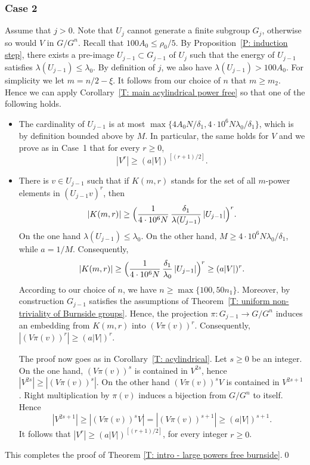 \subsubsection*{Case 2}
Assume that $j > 0$.
Note that $U_j$ cannot generate a finite subgroup $G_j$, otherwise so would $V$ in $G/G^n$.
Recall that $100 A_0 \leq \rho_0/5$.
By Proposition~\ref{P: induction step}, there exists a pre-image $U_{j-1}\subset G_{j-1}$ of $U_j$ such that the energy of $U_{j-1}$ satisfies $\lambda(U_{j-1}) \leqslant \lambda_0$.
By definition of $j$, we also have $\lambda(U_{j-1})> 100A_0$.
For simplicity we let $m = n/2 - \xi$.
It follows from our choice of $n$ that $m \geq m_2$.
Hence we can apply Corollary~\ref{T: main acylindrical power free} so that one of the following holds.
\begin{itemize}
\item The cardinality of $U_{j-1}$ is at most $\max\{4A_0N/\delta_1,4\cdot 10^6 N \lambda_0/\delta_1\}$, which is by definition bounded above by $M$.
In particular, the same holds for $V$ and we prove as in Case~1 that for every $r \geq 0$,
\begin{equation*}
|V^r| \geq \left(a |V|\right)^{[(r+1)/2]}.
\end{equation*}
\item There is $v \in U_{j-1}$ such that if $K(m,r)$ stands for the set of all $m$-power elements in $(U_{j-1}v)^r$, then
\begin{equation*}
|K(m,r)|
\geq \Bigl( \frac{1}{4\cdot 10^6 N}\,\frac{\delta_1}{\lambda(U_{j-1})}\, |U_{j-1}|\Bigr)^r.
\end{equation*}
On the one hand $\lambda(U_{j-1}) \leqslant \lambda_0$.
On the other hand, $M \geq 4\cdot 10^6 N \lambda_0/\delta_1$, while $a = 1/M$.
Consequently,
\begin{equation*}
|K(m,r)|
\geq \Bigl( \frac{1}{4\cdot 10^6 N}\,\frac{\delta_1}{\lambda_0}\, |U_{j-1}|\Bigr)^r
\geq(a|V|)^r.
\end{equation*}
According to our choice of $n$, we have $n \geq \max\{100, 50n_1\}$.
Moreover, by construction $G_{j-1}$ satisfies the assumptions of Theorem~\ref{T: uniform non-triviality of Burnside groups}.
Hence, the projection $\pi \colon G_{j-1} \to G/G^n$ induces an embedding from $K(m,r)$ into $(V \pi(v))^r$.
Consequently, $|(V \pi(v))^r| \geq \left(a |V|\right)^{r}.$

The proof now goes as in Corollary~\ref{T: acylindrical}.
Let $s \geq 0$ be an integer.
On the one hand, $(V\pi(v))^s$ is contained in $V^{2s}$, hence $|V^{2s}| \geq |(V\pi(v))^s|$.
On the other hand $(V\pi(v))^sV$ is contained in $V^{2s+1}$.
Right multiplication by $\pi(v)$ induces a bijection from $G/G^n$ to itself.
Hence
\begin{equation*}
|V^{2s+1}| \geq |(V\pi(v))^sV| = |(V\pi(v))^{s+1}| \geq \left(a |V|\right)^{s+1}.
\end{equation*}
It follows that $|V^r| \geq \left(a |V|\right)^{[(r+1)/2]}$, for every integer $r \geq 0$.
\end{itemize}
This completes the proof of Theorem \ref{T: intro - large powers free burnside}.\qed

